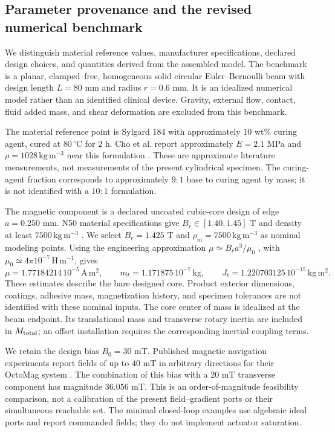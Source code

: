 \subsection{Parameter provenance and the revised numerical benchmark}
We distinguish material reference values, manufacturer specifications,
declared design choices, and quantities derived from the assembled model.
The benchmark is a planar, clamped--free, homogeneous solid circular
Euler--Bernoulli beam with design length $L=80$ mm and radius $r=0.6$ mm.
It is an idealized numerical model rather than an identified clinical device.
Gravity, external flow, contact, fluid added mass, and shear deformation
are excluded from this benchmark.

The material reference point is Sylgard 184 with approximately $10$ wt\%
curing agent, cured at $80\,^{\circ}\mathrm C$ for $2$ h.
Cho et al. report approximately $E=2.1$ MPa and
$\rho=1028\,\mathrm{kg\,m^{-3}}$ near this formulation
\cite{cho2021pdms}. These are approximate literature measurements, not
measurements of the present cylindrical specimen. The curing-agent fraction
corresponds to approximately $9{:}1$ base to curing agent by mass; it is not
identified with a $10{:}1$ formulation.

The magnetic component is a declared uncoated cubic-core design of edge
$a=0.250$ mm. N50 material specifications give
$B_r\in[1.40,1.45]$ T and density at least
$7500\,\mathrm{kg\,m^{-3}}$ \cite{smN50}.
We select $B_r=1.425$ T and $\rho_m=7500\,\mathrm{kg\,m^{-3}}$
as nominal modeling points. Using the engineering approximation
$\mu\simeq B_ra^3/\mu_0$ \cite{kjMoment}, with
$\mu_0\simeq4\pi10^{-7}\,\mathrm{H\,m^{-1}}$, gives
\[
 \mu=1.77184214\,10^{-5}\,\mathrm{A\,m^2},\qquad
 m_t=1.171875\,10^{-7}\,\mathrm{kg},\qquad
 J_t=1.220703125\,10^{-15}\,\mathrm{kg\,m^2}.
\]
These estimates describe the bare designed core. Product exterior dimensions,
coatings, adhesive mass, magnetization history, and specimen tolerances are
not identified with these nominal inputs. The core center of mass is
idealized at the beam endpoint. Its translational mass and transverse rotary
inertia are included in $M_{\rm total}$; an offset installation requires the
corresponding inertial coupling terms.

We retain the design bias $B_0=30$ mT. Published magnetic navigation
experiments report fields of up to $40$ mT in arbitrary directions for their
OctoMag system \cite{lussi2021cvs}. The combination of this bias with a
$20$ mT transverse component has magnitude $36.056$ mT. This is an
order-of-magnitude feasibility comparison, not a calibration of the present
field--gradient ports or their simultaneous reachable set. The minimal
closed-loop examples use algebraic ideal ports and report commanded fields;
they do not implement actuator saturation.

